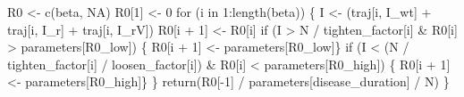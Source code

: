 \documentclass[
  11pt,
  letterpaper,
  DIV=11,
  numbers=noendperiod]{scrartcl}
\newenvironment{Shaded}{\begin{snugshade}}{\end{snugshade}}
\newcommand{\ConstantTok}[1]{\textcolor[rgb]{0.56,0.35,0.01}{#1}}
\newcommand{\ControlFlowTok}[1]{\textcolor[rgb]{0.00,0.23,0.31}{#1}}
\newcommand{\DecValTok}[1]{\textcolor[rgb]{0.68,0.00,0.00}{#1}}
\newcommand{\FunctionTok}[1]{\textcolor[rgb]{0.28,0.35,0.67}{#1}}
\newcommand{\NormalTok}[1]{\textcolor[rgb]{0.00,0.23,0.31}{#1}}
\newcommand{\OtherTok}[1]{\textcolor[rgb]{0.00,0.23,0.31}{#1}}
\newcommand{\SpecialCharTok}[1]{\textcolor[rgb]{0.37,0.37,0.37}{#1}}
\newcommand{\StringTok}[1]{\textcolor[rgb]{0.13,0.47,0.30}{#1}}
\begin{document}
\begin{Shaded}
\begin{Highlighting}[]
\NormalTok{    R0 }\OtherTok{\textless{}{-}} \FunctionTok{c}\NormalTok{(beta, }\ConstantTok{NA}\NormalTok{)}
\NormalTok{    R0[}\DecValTok{1}\NormalTok{] }\OtherTok{\textless{}{-}} \DecValTok{0}
    \ControlFlowTok{for}\NormalTok{ (i }\ControlFlowTok{in} \DecValTok{1}\SpecialCharTok{:}\FunctionTok{length}\NormalTok{(beta)) \{}
\NormalTok{        I }\OtherTok{\textless{}{-}}\NormalTok{ (traj[i, }\StringTok{\textquotesingle{}I\_wt\textquotesingle{}}\NormalTok{] }\SpecialCharTok{+}\NormalTok{ traj[i, }\StringTok{\textquotesingle{}I\_r\textquotesingle{}}\NormalTok{] }\SpecialCharTok{+}\NormalTok{ traj[i, }\StringTok{\textquotesingle{}I\_rV\textquotesingle{}}\NormalTok{])}
\NormalTok{        R0[i }\SpecialCharTok{+} \DecValTok{1}\NormalTok{] }\OtherTok{\textless{}{-}}\NormalTok{ R0[i]}
        \ControlFlowTok{if}\NormalTok{ (I }\SpecialCharTok{\textgreater{}}\NormalTok{ N }\SpecialCharTok{/}\NormalTok{ tighten\_factor[i] }\SpecialCharTok{\&}\NormalTok{ R0[i] }\SpecialCharTok{\textgreater{}}\NormalTok{ parameters[}\StringTok{\textquotesingle{}R0\_low\textquotesingle{}}\NormalTok{]) \{}
\NormalTok{            R0[i }\SpecialCharTok{+} \DecValTok{1}\NormalTok{] }\OtherTok{\textless{}{-}}\NormalTok{ parameters[}\StringTok{\textquotesingle{}R0\_low\textquotesingle{}}\NormalTok{]\}}
        \ControlFlowTok{if}\NormalTok{ (I }\SpecialCharTok{\textless{}}\NormalTok{ (N }\SpecialCharTok{/}\NormalTok{ tighten\_factor[i] }\SpecialCharTok{/}\NormalTok{ loosen\_factor[i]) }\SpecialCharTok{\&}\NormalTok{ R0[i] }\SpecialCharTok{\textless{}}\NormalTok{ parameters[}\StringTok{\textquotesingle{}R0\_high\textquotesingle{}}\NormalTok{])  \{}
\NormalTok{            R0[i }\SpecialCharTok{+} \DecValTok{1}\NormalTok{] }\OtherTok{\textless{}{-}}\NormalTok{ parameters[}\StringTok{\textquotesingle{}R0\_high\textquotesingle{}}\NormalTok{]\}}
\NormalTok{    \}}
    \FunctionTok{return}\NormalTok{(R0[}\SpecialCharTok{{-}}\DecValTok{1}\NormalTok{] }\SpecialCharTok{/}\NormalTok{ parameters[}\StringTok{\textquotesingle{}disease\_duration\textquotesingle{}}\NormalTok{] }\SpecialCharTok{/}\NormalTok{ N)}
\NormalTok{\}}
\end{Highlighting}
\end{Shaded}
\end{document}
